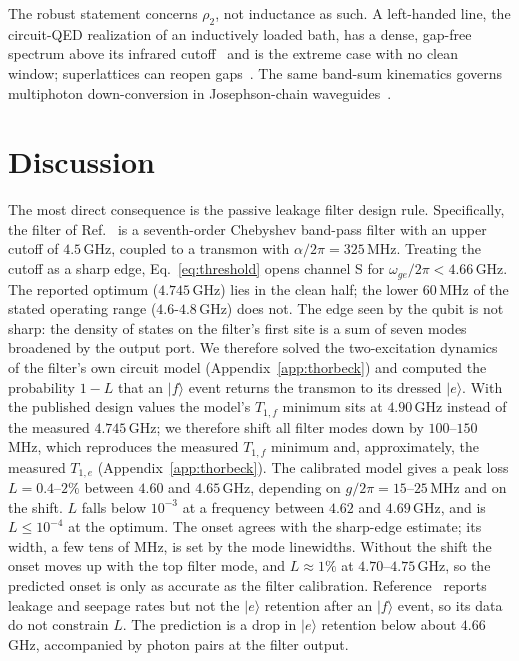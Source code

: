\documentclass[aps,prresearch,twocolumn,superscriptaddress,nofootinbib,longbibliography,floatfix]{revtex4-2}
\begin{document}
The robust statement concerns $\rho_2$, not inductance as such. A left-handed line, the circuit-QED realization of an
inductively loaded bath, has a dense, gap-free spectrum above its infrared cutoff~\cite{EggerWilhelm2013,Indrajeet2020,McBroomCarroll2024,Goswami2026}
and is the extreme case with no clean window; superlattices can reopen gaps~\cite{Messinger2019}. The same band-sum
kinematics governs multiphoton down-conversion in Josephson-chain waveguides~\cite{Mehta2023}.


\section{Discussion}\label{sec:disc}

The most direct consequence is the passive leakage filter design rule. Specifically, the filter of Ref.~\cite{Thorbeck2024} is a seventh-order Chebyshev band-pass filter
with an upper cutoff of $4.5$\,GHz, coupled to a transmon with $\alpha/2\pi=325$\,MHz. Treating the cutoff as a sharp
edge, Eq.~\eqref{eq:threshold} opens channel S for $\omega_{ge}/2\pi<4.66$\,GHz. The reported optimum ($4.745$\,GHz)
lies in the clean half; the lower $60$\,MHz of the stated operating range ($4.6$-$4.8$\,GHz) does not. The edge seen by
the qubit is not sharp: the density of states on the filter's first site is a sum of seven modes broadened by the
output port. We therefore solved the two-excitation dynamics of the filter's own circuit model
(Appendix~\ref{app:thorbeck}) and computed the probability $1-L$ that an $|f\rangle$ event returns the transmon to its
dressed $|e\rangle$. With the published design values the model's $T_{1,f}$ minimum sits at $4.90$\,GHz instead of the
measured $4.745$\,GHz; we therefore shift all filter modes down by $100$--$150$\,MHz, which reproduces the measured
$T_{1,f}$ minimum and, approximately, the measured $T_{1,e}$ (Appendix~\ref{app:thorbeck}). The calibrated model gives a
peak loss $L=0.4$--$2\%$ between $4.60$ and $4.65$\,GHz, depending on $g/2\pi=15$--$25$\,MHz and on the shift. $L$ falls
below $10^{-3}$ at a frequency between $4.62$ and $4.69$\,GHz, and is $L\le10^{-4}$ at the optimum. The onset agrees
with the sharp-edge estimate; its width, a few tens of MHz, is set by the mode linewidths. Without the shift the onset
moves up with the top filter mode, and $L\approx1\%$ at $4.70$--$4.75$\,GHz, so the predicted onset is only as accurate
as the filter calibration.
Reference~\cite{Thorbeck2024} reports leakage and seepage rates but not the $|e\rangle$ retention after an $|f\rangle$
event, so its data do not constrain $L$. The prediction is a drop in $|e\rangle$ retention below about $4.66$\,GHz,
accompanied by photon pairs at the filter output.
\end{document}
